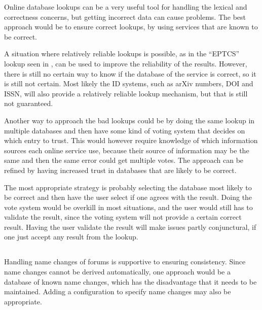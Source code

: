 Online database lookups can be a very useful tool for handling the
lexical and correctness concerns, but getting incorrect data can cause
problems.  The best approach would be to ensure correct lookups, by
using services that are known to be correct.

A situation where relatively reliable lookups is possible, as in the
``EPTCS'' lookup seen in , can be used to
improve the reliability of the results.  However, there is still no
certain way to know if the database of the service is correct, so it
is still not certain.  Most likely the ID systems, such as arXiv
numbers, DOI and ISSN, will also provide a relatively reliable lookup
mechanism, but that is still not guaranteed.

Another way to approach the bad lookups could be by doing the same
lookup in multiple databases and then have some kind of voting system
that decides on which entry to trust.  This would however require
knowledge of which information sources each online service use,
because their source of information may be the same and then the same
error could get multiple votes.  The approach can be refined by having
increased trust in databases that are likely to be correct.

The most appropriate strategy is probably selecting the database most
likely to be correct and then have the user select if one agrees with
the result.  Doing the vote system would be overkill in most
situations, and the user would still has to validate the result, since
the voting system will not provide a certain correct result.  Having
the user validate the result will make issues partly conjunctural, if
one just accept any result from the lookup.


\subsection{}

Handling name changes of forums is supportive to ensuring consistency.
Since name changes cannot be derived automatically, one approach would
be a database of known name changes, which has the disadvantage that
it needs to be maintained.  Adding a configuration to specify name
changes may also be appropriate.


\subsection{}

